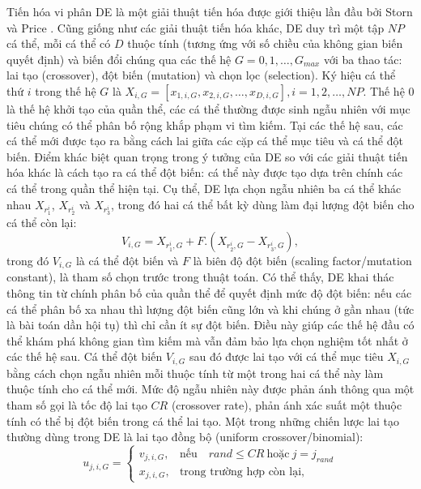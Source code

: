 \documentclass[../main.tex]{subfiles}
\begin{document}
Tiến hóa vi phân DE là một giải thuật tiến hóa được giới thiệu lần đầu bởi Storn và Price \cite{storn1997differential}. Cũng giống như các giải thuật tiến hóa khác, DE duy trì một tập $NP$ cá thể, mỗi cá thể có $D$ thuộc tính (tương ứng với số chiều của không gian biến quyết định) và biến đổi chúng qua các thế hệ $G = 0, 1,\ldots, G_{max}$ với ba thao tác: lai tạo (crossover), đột biến (mutation) và chọn lọc (selection). Ký hiệu cá thể thứ $i$ trong thế hệ $G$ là $X_{i,G} = \left[x_{1,i,G}, x_{2,i,G},\ldots,x_{D,i,G}\right], i = 1,2,\ldots,NP$. Thế hệ $0$ là thế hệ khởi tạo của quần thể, các cá thể thường được sinh ngẫu nhiên với mục tiêu chúng có thể phân bố rộng khắp phạm vi tìm kiếm. Tại các thế hệ sau, các cá thể mới được tạo ra bằng cách lai giữa các cặp cá thể mục tiêu và cá thể đột biến. Điểm khác biệt quan trọng trong ý tưởng của DE so với các giải thuật tiến hóa khác là cách tạo ra cá thể đột biến: cá thể này được tạo dựa trên chính các cá thể trong quần thể hiện tại. Cụ thể, DE lựa chọn ngẫu nhiên ba cá thể khác nhau $X_{r_1^i}$, $X_{r_2^i}$ và $X_{r_3^i}$, trong đó hai cá thể bất kỳ dùng làm đại lượng đột biến cho cá thể còn lại: 
\begin{equation}
    V_{i,G} = X_{r_1^i,G} + F.\left(X_{r_2^i,G} - X_{r_3^i,G}\right),
\end{equation}
trong đó $V_{i,G}$ là cá thể đột biến và $F$ là biên độ đột biến (scaling factor/mutation constant), là tham số chọn trước trong thuật toán. Có thể thấy, DE khai thác thông tin từ chính phân bố của quần thể để quyết định mức độ đột biến: nếu các cá thể phân bố xa nhau thì lượng đột biến cũng lớn và khi chúng ở gần nhau (tức là bài toán dần hội tụ) thì chỉ cần ít sự đột biến. Điều này giúp các thế hệ đầu có thể khám phá không gian tìm kiếm mà vẫn đảm bảo lựa chọn nghiệm tốt nhất ở các thế hệ sau. Cá thể đột biến $V_{i,G}$ sau đó được lai tạo với cá thể mục tiêu $X_{i,G}$ bằng cách chọn ngẫu nhiên mỗi thuộc tính từ một trong hai cá thể này làm thuộc tính cho cá thể mới. Mức độ ngẫu nhiên này được phản ánh thông qua một tham số gọi là tốc độ lai tạo $CR$ (crossover rate), phản ánh xác suất một thuộc tính có thể bị đột biến trong cá thể lai tạo. Một trong những chiến lược lai tạo thường dùng trong DE là lai tạo đồng bộ (uniform crossover/binomial):
\begin{equation}
u_{j,i,G} = 
\begin{cases}
    v_{j,i,G},& \text{nếu} \quad rand \leq CR \ \text{hoặc}\ j = j_{rand} \\
    x_{j,i,G},& \text{trong trường hợp còn lại},
\end{cases}
\end{equation}
\end{document}
